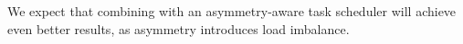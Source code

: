 We expect that combining {\proposal} with an asymmetry-aware task scheduler will achieve even better results, as asymmetry introduces load imbalance.


